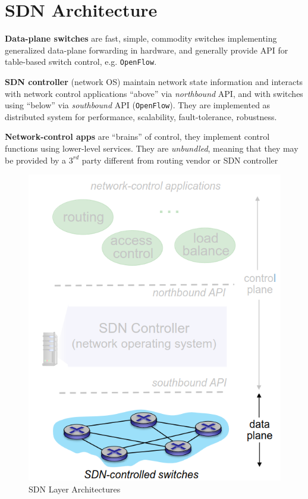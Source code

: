 \section{SDN Architecture}
\begin{paracol}{2}
   \textbf{Data-plane switches} are fast, simple, commodity switches implementing generalized data-plane forwarding in hardware, and generally provide API for table-based switch control, e.g. \texttt{OpenFlow}.

   \textbf{SDN controller} (network OS) maintain network state information and interacts with network control applications ``above'' via \textit{northbound} API, and with switches using ``below'' via \textit{southbound} API (\texttt{OpenFlow}).
   They are implemented as distributed system for performance, scalability, fault-tolerance, robustness.

   \textbf{Network-control apps} are ``brains'' of control, they implement control functions using lower-level services. They are \textit{unbundled}, meaning that they may be provided by a $3^{rd}$ party different from routing vendor or SDN controller
   \switchcolumn
   \begin{figure}[htbp]
      \centering
      \includegraphics{images/sdn_planes3.png}
      \caption{SDN Layer Architectures}
      \label{fig:sdn_planes3}
   \end{figure}
\end{paracol}


